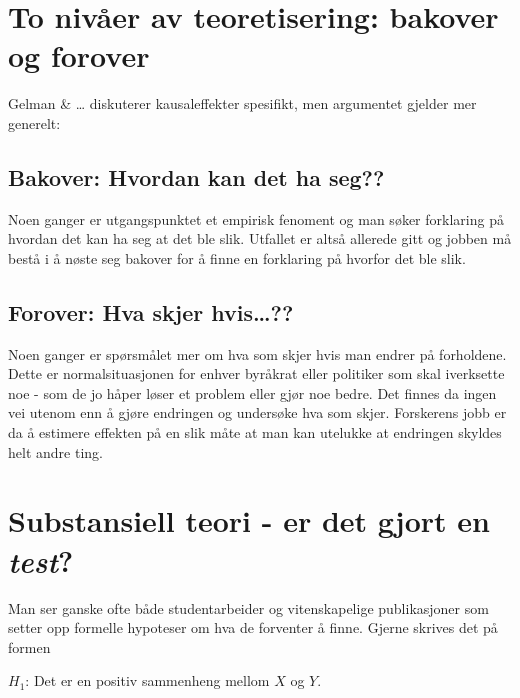 \documentclass[
  letterpaper,
  DIV=11,
  numbers=noendperiod]{scrreprt}
\begin{document}
\hypertarget{to-nivuxe5er-av-teoretisering-bakover-og-forover}{%
\section{To nivåer av teoretisering: bakover og
forover}\label{to-nivuxe5er-av-teoretisering-bakover-og-forover}}

Gelman \& \ldots{} diskuterer kausaleffekter spesifikt, men argumentet
gjelder mer generelt:

\hypertarget{bakover-hvordan-kan-det-ha-seg}{%
\subsection{Bakover: Hvordan kan det ha
seg??}\label{bakover-hvordan-kan-det-ha-seg}}

Noen ganger er utgangspunktet et empirisk fenoment og man søker
forklaring på hvordan det kan ha seg at det ble slik. Utfallet er altså
allerede gitt og jobben må bestå i å nøste seg bakover for å finne en
forklaring på hvorfor det ble slik.

\hypertarget{forover-hva-skjer-hvis}{%
\subsection{Forover: Hva skjer
hvis\ldots??}\label{forover-hva-skjer-hvis}}

Noen ganger er spørsmålet mer om hva som skjer hvis man endrer på
forholdene. Dette er normalsituasjonen for enhver byråkrat eller
politiker som skal iverksette noe - som de jo håper løser et problem
eller gjør noe bedre. Det finnes da ingen vei utenom enn å gjøre
endringen og undersøke hva som skjer. Forskerens jobb er da å estimere
effekten på en slik måte at man kan utelukke at endringen skyldes helt
andre ting.

\hypertarget{substansiell-teori---er-det-gjort-en-test}{%
\section{\texorpdfstring{Substansiell teori - er det gjort en
\emph{test}?}{Substansiell teori - er det gjort en test?}}\label{substansiell-teori---er-det-gjort-en-test}}

Man ser ganske ofte både studentarbeider og vitenskapelige publikasjoner
som setter opp formelle hypoteser om hva de forventer å finne. Gjerne
skrives det på formen

\leavevmode{}%
\(H_1\): Det er en positiv sammenheng mellom \(X\) og \(Y\).\\
\end{document}
